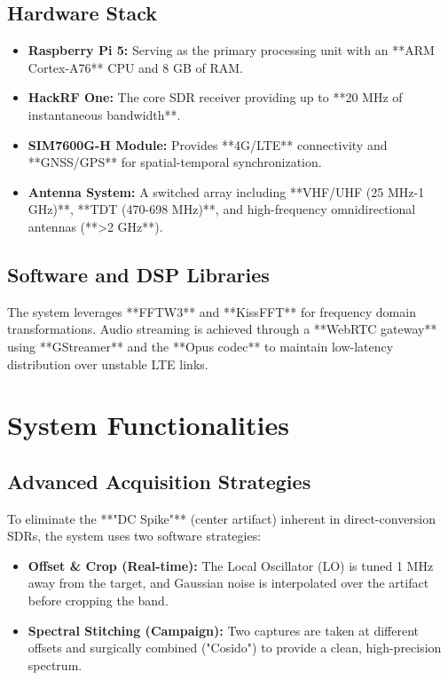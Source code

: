 \documentclass[a4paper,12pt]{article}
\begin{document}
\subsection{Hardware Stack}
\begin{itemize}
    \item \textbf{Raspberry Pi 5:} Serving as the primary processing unit with an **ARM Cortex-A76** CPU and 8 GB of RAM.
    \item \textbf{HackRF One:} The core SDR receiver providing up to **20 MHz of instantaneous bandwidth**.
    \item \textbf{SIM7600G-H Module:} Provides **4G/LTE** connectivity and **GNSS/GPS** for spatial-temporal synchronization.
    \item \textbf{Antenna System:} A switched array including **VHF/UHF (25 MHz-1 GHz)**, **TDT (470-698 MHz)**, and high-frequency omnidirectional antennas (**>2 GHz**).
\end{itemize}

\subsection{Software and DSP Libraries}
The system leverages **FFTW3** and **KissFFT** for frequency domain transformations. Audio streaming is achieved through a **WebRTC gateway** using **GStreamer** and the **Opus codec** to maintain low-latency distribution over unstable LTE links.

\section{System Functionalities}
\subsection{Advanced Acquisition Strategies}
To eliminate the **"DC Spike"** (center artifact) inherent in direct-conversion SDRs, the system uses two software strategies:
\begin{itemize}
    \item \textbf{Offset \& Crop (Real-time):} The Local Oscillator (LO) is tuned 1 MHz away from the target, and Gaussian noise is interpolated over the artifact before cropping the band.
    \item \textbf{Spectral Stitching (Campaign):} Two captures are taken at different offsets and surgically combined ("Cosido") to provide a clean, high-precision spectrum.
\end{itemize}
\end{document}
